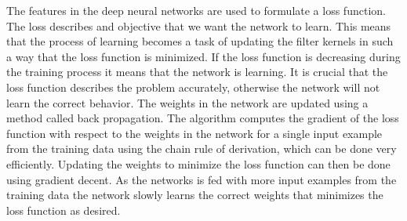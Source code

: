 The features in the deep neural networks are used to formulate a loss function. The loss describes and objective that we want the network to learn. This means that the process of learning becomes a task of updating the filter kernels in such a way that the loss function is minimized. If the loss function is decreasing during the training process it means that the network is learning. It is crucial that the loss function describes the problem accurately, otherwise the network will not learn the correct behavior. The weights in the network are updated using a method called back propagation. The algorithm computes the gradient of the loss function with respect to the weights in the network for a single input example from the training data using the chain rule of derivation, which can be done very efficiently. Updating the weights to minimize the loss function can then be done using gradient decent. As the networks is fed with more input examples from the training data the network slowly learns the correct weights that minimizes the loss function as desired.


